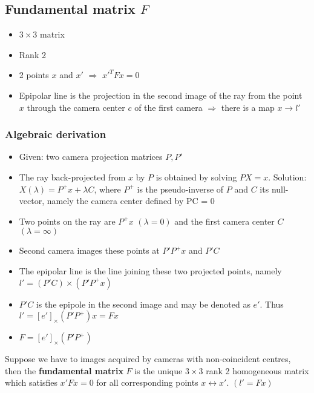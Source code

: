 \documentclass[a4paper]{article}
\begin{document}
\subsection*{Fundamental matrix $F$}
\begin{itemize}
    \item
        $3 \times 3$ matrix
    \item
        Rank 2
    \item
        2 points $x$ and $x'$ $\Rightarrow$ $x'^T F x = 0$
    \item
        Epipolar line is the projection in the second image of the ray from the point $x$ through the camera center $c$ of the first camera $\Rightarrow$ there is a map $x \rightarrow l'$
\end{itemize}
\subsubsection*{Algebraic derivation}
\begin{itemize}
    \item
        Given: two camera projection matrices $P, P'$
    \item
        The ray back-projected from $x$ by $P$ is obtained by solving $PX = x$. Solution: $X(\lambda) = P^{+} x + \lambda C$, where $P^{+}$ is the pseudo-inverse of $P$ and $C$ its null-vector, namely the camera center defined by PC = 0
    \item
        Two points on the ray are $P^{+}x$ $(\lambda = 0)$ and the first camera center $C$ $(\lambda = \infty)$
    \item
        Second camera images these points at $P'P^{+}x$ and $P'C$
    \item
        The epipolar line is the line joining these two projected points, namely $l' = (P'C) \times (P'P^{+}x)$
    \item
        $P'C$ is the epipole in the second image and may be denoted as $e'$. Thus $l' = [e']_{\times} (P'P^{+})x = Fx$
    \item
        $F = [e']_{\times} (P'P^{+})$
\end{itemize}

Suppose we have to images acquired by cameras with non-coincident centres, then the \textbf{fundamental matrix} $F$ is the unique $3 \times 3$ rank 2 homogeneous matrix which satisfies $x'Fx = 0$ for all corresponding points $x \leftrightarrow x'$. $(l' = Fx)$
\end{document}

